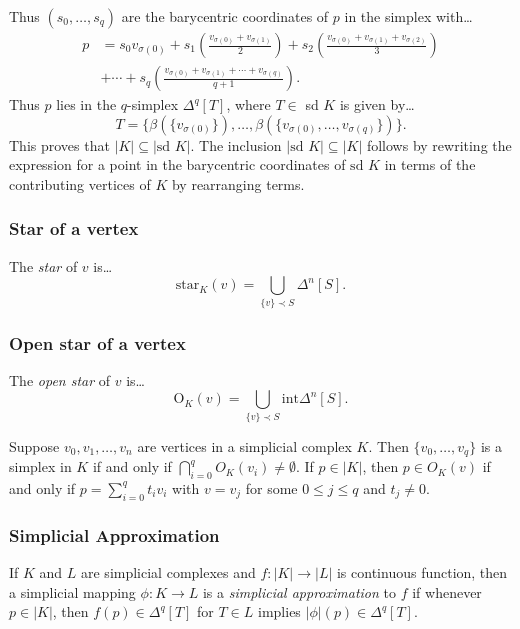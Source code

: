 Thus $(s_0, \dots, s_q)$ are the barycentric coordinates of $p$ in the simplex with\dots
\begin{align*}
p &= s_0 v_{\sigma(0)} + s_1\left(\frac{v_{\sigma(0)} + v_{\sigma(1)}}{2}\right) + s_2\left(\frac{v_{\sigma(0)} + v_{\sigma(1)} + v_{\sigma(2)}}{3}\right)\\
  &+ \cdots + s_q\left(\frac{v_{\sigma(0)} + v_{\sigma(1)} + \cdots + v_{\sigma(q)}}{q+1}\right).
\end{align*}
Thus $p$ lies in the $q$-simplex $\Delta^q[T]$, where $T \in$ sd $K$ is given by\dots
$$T = \{\beta(\{v_{\sigma(0)}\}), \dots, \beta(\{v_{\sigma(0)}, \dots, v_{\sigma(q)} \}) \}.$$
This proves that $|K| \subseteq |\textrm{sd } K|$. The inclusion $|\textrm{sd } K| \subseteq |K|$ follows by rewriting the
expression for a point in the barycentric coordinates of $\textrm{sd }K$ in terms of the contributing vertices of $K$ by rearranging terms.

\subsubsection{Star of a vertex}\label{star}
The \emph{star} of $v$ is\dots
$$\textrm{star}_K(v) = \bigcup_{\{v\} \prec S} \Delta^n[S].$$

\subsubsection{Open star of a vertex}\label{openstar}
The \emph{open star} of $v$ is\dots
$$\textrm{O}_K(v) = \bigcup_{\{v\} \prec S} \textrm{int} \Delta^n[S].$$

\begin{lemma}
Suppose $v_0, v_1, \dots, v_n$ are vertices in a simplicial complex $K$. Then $\{ v_0, \dots, v_q \}$ is a simplex in $K$
if and only if $\bigcap^q_{i=0}O_K(v_i) \neq \emptyset$. If $p \in |K|$, then $p \in O_K(v)$ if and only if $p = \sum_{i=0}^q t_i v_i$
with $v = v_j$ for some $0 \leq j \leq q$ and $t_j \neq 0$.
\end{lemma}

\subsubsection{Simplicial Approximation}\label{simplicialapproximation}
If $K$ and $L$ are simplicial complexes and $f : |K| \rightarrow |L|$ is continuous function, then a simplicial
mapping $\phi : K \rightarrow L$ is a \emph{simplicial approximation} to $f$ if whenever $p \in |K|$, then $f(p) \in \Delta^q[T]$ for $T \in L$
implies $|\phi|(p) \in \Delta^q[T]$.

